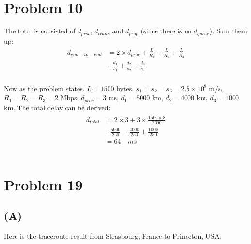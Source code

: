 \documentclass[paper=a4, fontsize=11pt]{scrartcl} %
\numberwithin{equation}{section} %
\numberwithin{figure}{section} %
\numberwithin{table}{section} %
\begin{document}

\section*{Problem 10}
The total is consisted of $d_{proc}$, $d_{trans}$ and $d_{prop}$ (since there is no $d_{queue}$). Sum them up:
\begin{align} 
\begin{split}
d_{end-to-end} &= 2 \times d_{proc} + \frac{L}{R_1} + \frac{L}{R_2} + \frac{L}{R_3} \\
&+ \frac{d_1}{s_1} + \frac{d_2}{s_2} + \frac{d_3}{s_3}
\end{split}					
\end{align}
\\
Now as the problem states, $L = 1500$ bytes, $s_1 = s_2 = s_3 = 2.5 \times 10^8$ m/s,
$R_1 = R_2 = R_3 = 2$ Mbps, $d_{proc} = 3$ ms, $d_1 = 5000$ km, $d_2 = 4000$ km, $d_3 = 1000$ km.
The total delay can be derived:
\begin{align} 
\begin{split}
d_{total} &= 2 \times 3 + 3 \times \frac{1500 \times 8}{2000} \\
&+ \frac{5000}{250} + \frac{4000}{250} + \frac{1000}{250}\\
&= 64 \quad ms
\end{split}					
\end{align}
\\



\section*{Problem 19}
\subsection*{(A)}
Here is the traceroute result from Strasbourg, France to Princeton, USA: \\
\end{document}

